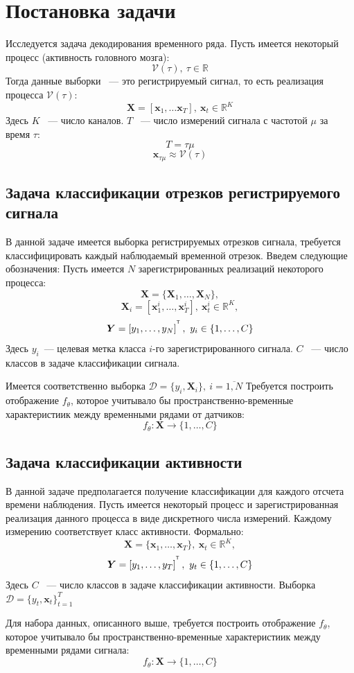 \documentclass[a4paper, 12pt]{extarticle}
\begin{document}
\section{Постановка задачи}
Исследуется задача декодирования временного ряда. Пусть имеется некоторый процесс (активность головного мозга):
$$\mathcal{V}(\tau),~\tau \in \mathbb{R}$$
Тогда данные выборки ~--- это регистрируемый сигнал, то есть реализация процесса $\mathcal{V}(\tau)$:
$$\bm{X} = \left[\bm{x}_1,\dots \bm{x}_{T}\right],~\bm{x}_t \in \mathbb{R}^K$$
Здесь $K$ ~--- число каналов. $T$ ~--- число измерений сигнала с частотой $\mu$ за время $\tau$:
$$T = \tau \mu$$
$$\bm{x}_{\tau \mu} \approx \mathcal{V}(\tau)$$
\subsection{Задача классификации отрезков регистрируемого сигнала}
В данной задаче имеется выборка регистрируемых отрезков сигнала, 
требуется классифицировать каждый наблюдаемый временной отрезок. 
Введем следующие обозначения:
Пусть имеется $N$ зарегистрированных реализаций некоторого процесса:
$$\bm{X} = \{\bm{X}_1,\dots, \bm{X}_N\},$$
$$\bm{X}_i = \left[\bm{x}^i_1,\dots, \bm{x}^i_{T}\right], ~\bm{x}^i_t \in \mathbb{R}^K,$$
$$\bm{Y} = \left[y_1, \dots, y_{N}\right]^{^{\mathsf{T}}},~y_i \in \{1,\dots, C\}$$
Здесь $y_i$~--- целевая метка класса $i$-го зарегистрированного сигнала. $C$ ~--- число классов в задаче классификации сигнала. 

Имеется соответственно выборка $\mathcal{D} = \{y_i, \bm{X}_i\},~  i = \overline{1,N}$
Требуется построить отображение $f_\theta$, которое учитывало 
бы пространственно-временные характеристиик между временными рядами от датчиков:
$$f_\theta: \bm{X} \rightarrow \{1,\dots, C\}$$ 
\subsection{Задача классификации активности}
В данной задаче предполагается получение классификации для каждого отсчета 
времени наблюдения.
Пусть имеется некоторый процесс и зарегистрированная реализация данного 
процесса в виде дискретного числа измерений. Каждому измерению соответствует
класс активности. Формально:
$$\bm{X} = \{\bm{x}_1,\dots, \bm{x}_{T}\}, ~\bm{x}_t \in \mathbb{R}^K,$$
$$\bm{Y} = \left[y_1, \dots, y_{T}\right]^{^{\mathsf{T}}},~y_t \in \{1,\dots, C\}$$
Здесь $C$ ~--- число классов в задаче классификации активности. 
Выборка $\mathcal{D} = \{y_t, \bm{x}_t\}_{t=1}^T$

Для набора данных, описанного выше, требуется построить отображение $f_\theta$, которое учитывало 
бы пространственно-временные характеристиик между временными рядами сигнала:
$$f_\theta: \bm{X} \rightarrow \{1,\dots, C\}$$ 
\end{document}
